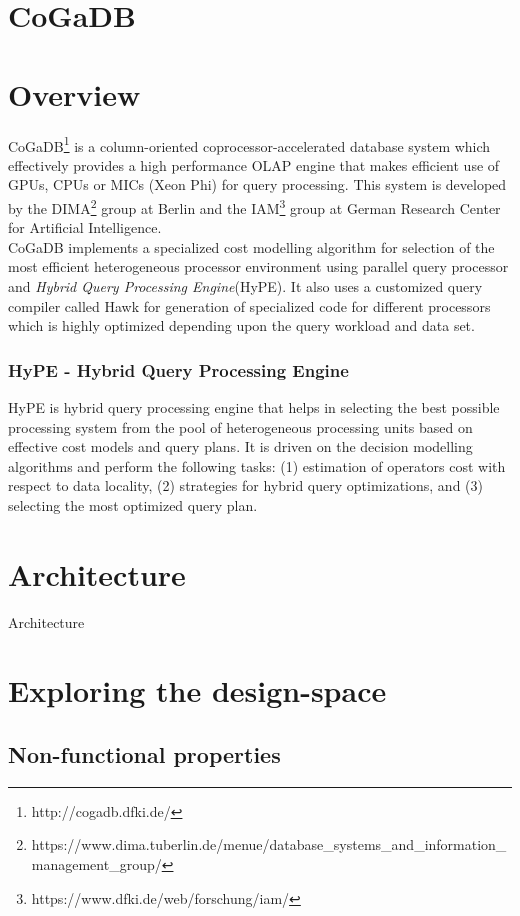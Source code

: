 \documentclass[a4paper, 11pt]{article}
\begin{document}
\section*{CoGaDB}
\section*{Overview}
CoGaDB\footnote{http://cogadb.dfki.de/} is a column-oriented coprocessor-accelerated database system which effectively provides a high performance OLAP engine that makes efficient use of GPUs, CPUs or MICs (Xeon Phi) for query processing. This system is developed by the DIMA\footnote{https://www.dima.tu\text{-}berlin.de/menue/database\_systems\_and\_information\_management\_group/} group at Berlin and the IAM\footnote{https://www.dfki.de/web/forschung/iam/} group at German Research Center for Artificial Intelligence.
\\
CoGaDB implements a specialized cost modelling algorithm for selection of the most efficient heterogeneous processor environment using parallel query processor and \emph{Hybrid Query Processing Engine}(HyPE)\cite{cogadb_hype}. It also uses a customized query compiler called Hawk\cite{cogadb_hawk} for generation of specialized code for different processors which is highly optimized depending upon the query workload and data set.

\subsubsection*{HyPE - Hybrid Query Processing Engine}
HyPE is hybrid query processing engine that helps in selecting the best possible processing system from the pool of heterogeneous processing units based on effective cost models and query plans. It is driven on the decision modelling algorithms and perform the following tasks\cite{cogadb_hype}: (1) estimation of operators cost with respect to data locality, (2) strategies for hybrid query optimizations, and (3) selecting the most optimized query plan.

\section*{Architecture}
Architecture

\section*{Exploring the design-space}
\subsection*{Non-functional properties}
\end{document}

